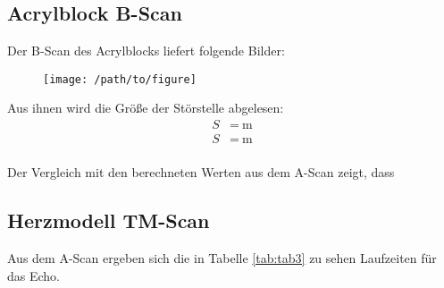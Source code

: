 \subsection{Acrylblock B-Scan}
Der B-Scan des Acrylblocks liefert folgende Bilder:

\begin{figure}[H]
  \centering
  \texttt{[image: /path/to/figure]}
  \caption{}
  \label{}
\end{figure}

Aus ihnen wird die Größe der Störstelle abgelesen:
\begin{align*}
  S&=\SI{}{\m}\\
  S&=\SI{}{\m}\\
\end{align*}

Der Vergleich mit den berechneten Werten aus dem A-Scan zeigt, dass






\subsection{Herzmodell TM-Scan}
Aus dem A-Scan ergeben sich die in Tabelle \ref{tab:tab3} zu sehen Laufzeiten
für das Echo.

